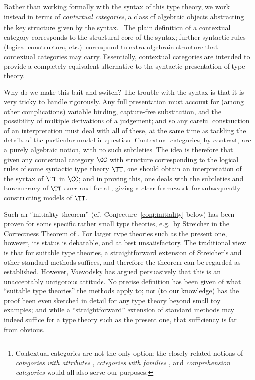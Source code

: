 Rather than working formally with the syntax of this type theory, we work instead in terms of \emph{contextual categories}, a class of algebraic objects abstracting the key structure given by the syntax.\footnote{Contextual categories are not the only option; the closely related notions of \emph{categories with attributes} \cite{cartmell:thesis,moggi:program-modules,pitts:categorial-logic}, \emph{categories with families} \cite{dybjer:internal-type-theory,hofmann:syntax-and-semantics}, and \emph{comprehension categories} \cite{jacobs:comprehension-categories} would all also serve our purposes.}  The plain definition of a contextual category corresponds to the structural core of the syntax; further syntactic rules (logical constructors, etc.)\ correspond to extra algebraic structure that contextual categories may carry.  Essentially, contextual categories are intended to provide a completely equivalent alternative to the syntactic presentation of type theory.

Why do we make this bait-and-switch?  The trouble with the syntax is that it is very tricky to handle rigorously. Any full presentation must account for (among other complications) variable binding, capture-free substitution, and the possibility of multiple derivations of a judgement; and so any careful construction of an interpretation must deal with all of these, at the same time as tackling the details of the particular model in question.  Contextual categories, by contrast, are a purely algebraic notion, with no such subtleties.  The idea is therefore that given any contextual category $\CC$ with structure corresponding to the logical rules of some syntactic type theory $\TT$, one should obtain an interpretation of the syntax of $\TT$ in $\CC$; and in proving this, one deals with the subtleties and bureaucracy of $\TT$ once and for all, giving a clear framework for subsequently constructing models of $\TT$.

Such an “initiality theorem” (cf.\ Conjecture~\ref{conj:initiality} below) has been proven for some specific rather small type theories, e.g.\ by Streicher in the Correctness Theorem of \cite[Ch.~III, p.~181]{streicher:book}.  For larger type theories such as the present one, however, its status is debatable, and at best unsatisfactory.  The traditional view is that for suitable type theories, a straightforward extension of Streicher’s and other standard methods suffices, and therefore the theorem can be regarded as established.  However, Voevodsky has argued persuasively that this is an unacceptably unrigorous attitude.  No precise definition has been given of what “suitable type theories” the methods apply to; nor (to our knowledge) has the proof been even sketched in detail for any type theory beyond small toy examples; and while a “straightforward” extension of standard methods may indeed suffice for a type theory such as the present one, that sufficiency is far from obvious.

